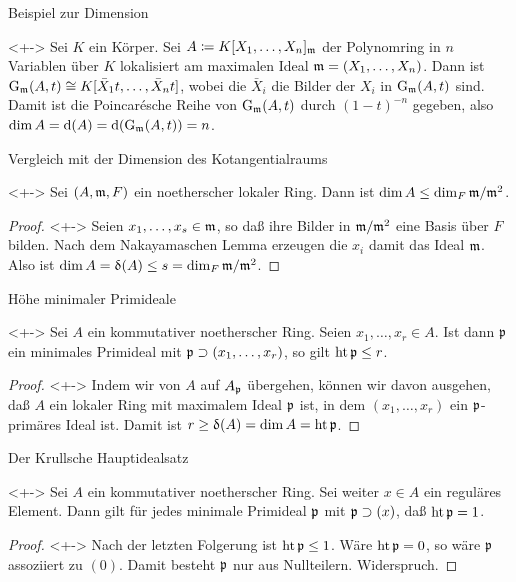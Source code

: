 \begin{frame}{Beispiel zur Dimension}
	\begin{example}<+->
		Sei \(K\) ein Körper. Sei \(A \coloneqq K[X_1, \dotsc, X_n]_{\mathfrak{m}}\) der Polynomring in \(n\) Variablen über \(K\)
		lokalisiert am maximalen Ideal \(\mathfrak{m} = (X_1, \dotsc, X_n)\). Dann ist \(\operatorname{G}_{\mathfrak{m}}(A, t) \cong
		K[\bar X_1 t, \dotsc, \bar X_n t]\), wobei die \(\bar X_i\) die Bilder der \(X_i\) in \(\operatorname{G}_{\mathfrak{m}}(A, t)\) sind.
		\\
		Damit ist die Poincarésche Reihe von \(\operatorname{G}_{\mathfrak{m}}(A, t)\) durch \((1 - t)^{- n}\) gegeben, also
		\(\dim A = \operatorname{d}(A) = \operatorname{d}(\operatorname{G}_{\mathfrak{m}}(A, t)) = n\).
	\end{example}
\end{frame}

\begin{frame}{Vergleich mit der Dimension des Kotangentialraums}
	\begin{corollary}<+->
		Sei \((A, \mathfrak{m}, F)\) ein noetherscher lokaler Ring. Dann ist \(\dim A \leq \dim_F \mathfrak{m}/\mathfrak{m}^2\).
	\end{corollary}
	\begin{proof}<+->
		Seien \(x_1, \dotsc, x_s \in \mathfrak{m}\), so daß ihre Bilder in \(\mathfrak{m}/\mathfrak{m}^2\) eine Basis über \(F\) bilden.
		Nach dem Nakayamaschen Lemma erzeugen die \(x_i\) damit das Ideal \(\mathfrak{m}\). Also ist \(\dim A = \updelta(A) \le s
		= \dim_F \mathfrak{m}/\mathfrak{m}^2\).
	\end{proof}
\end{frame}

\begin{frame}{Höhe minimaler Primideale}
	\begin{corollary}<+->
		Sei \(A\) ein kommutativer noetherscher Ring. Seien \(x_1, \dotsc, x_r \in A\). Ist dann \(\mathfrak{p}\) ein
		minimales Primideal mit \(\mathfrak{p} \supset (x_1, \dotsc, x_r)\), so gilt \(\operatorname{ht} \mathfrak{p} \le r\).
	\end{corollary}
	\begin{proof}<+->
		Indem wir von \(A\) auf \(A_{\mathfrak{p}}\) übergehen, 
		können wir davon ausgehen, daß \(A\) ein lokaler Ring mit maximalem Ideal \(\mathfrak{p}\) ist, in dem \((x_1, \dotsc,
		x_r)\) ein \(\mathfrak{p}\)-primäres Ideal ist. Damit ist \(r \ge \updelta(A) = \dim A = \operatorname{ht} \mathfrak{p}\).
	\end{proof}
\end{frame}

\begin{frame}{Der Krullsche Hauptidealsatz}
	\begin{corollary}<+->
		Sei \(A\) ein kommutativer noetherscher Ring. Sei weiter \(x \in A\) ein reguläres Element.
		Dann gilt für jedes minimale Primideal \(\mathfrak{p}\) mit \(\mathfrak{p} \supset (x)\), daß \(\operatorname{ht} \mathfrak{p} = 1\).
	\end{corollary}
	\begin{proof}<+->
		Nach der letzten Folgerung ist \(\operatorname{ht} \mathfrak{p} \le 1\). Wäre \(\operatorname{ht} \mathfrak{p} = 0\),
		so wäre \(\mathfrak{p}\) assoziiert zu \((0)\).
		Damit besteht \(\mathfrak{p}\) nur aus Nullteilern. Widerspruch.
	\end{proof}
\end{frame}

